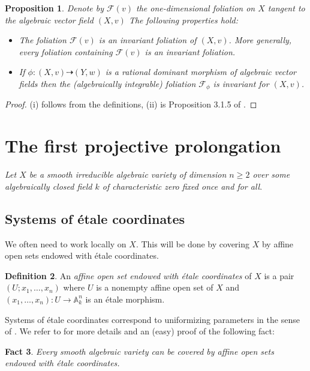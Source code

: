 \documentclass[12pt]{amsart}
\theoremstyle{definition}
\newtheorem{definition}{Definition}[subsection]
\theoremstyle{plain}
\newtheorem{proposition}[definition]{Proposition}
\newtheorem{fact}[definition]{Fact}
\theoremstyle{exampstyle}
\theoremstyle{exampstyle}\newtheorem{thmxbis}{Theorem}
\numberwithin{equation}{section}
\theoremstyle{remark}
\begin{document}
\begin{proposition} \label{proposition rational factors to invariant foliations}
Denote by $\mathcal F(v)$ the one-dimensional foliation on $X$ tangent to the algebraic vector field $(X,v)$ The following properties hold:
\begin{itemize} 
\item[(i)] The foliation $\mathcal F(v)$ is an invariant foliation of $(X,v)$. More generally, every foliation containing $\mathcal F(v)$ is an invariant foliation.
\item[(ii)] If $\phi: (X,v) \dashrightarrow (Y,w)$ is a rational dominant morphism of algebraic vector fields then the (algebraically integrable) foliation $\mathcal F_\phi$ is invariant for $(X,v)$.
\end{itemize} 
\end{proposition} 

\begin{proof} 
(i) follows from the definitions, (ii) is Proposition 3.1.5 of \cite{jaoui-Confluentes}. 
\end{proof}


\section{The first projective prolongation}
{\em{Let $X$ be a smooth irreducible algebraic variety of dimension $n \geq 2$ over some algebraically closed field $k$ of characteristic zero fixed once and for all}}. 

 
\subsection{Systems of étale coordinates} We often need to work locally on $X$. This will be done by covering $X$ by affine open sets endowed with étale coordinates.

\begin{definition}
An {\em affine open set endowed with étale coordinates} of $X$ is a pair $(U; x_1,\ldots, x_n)$ where $U$ is a nonempty affine open set of $X$ and $(x_1,\ldots, x_n): U \rightarrow \mathbb{A}^n_k$ is an étale morphism. 
\end{definition}
Systems of étale coordinates correspond to uniformizing parameters in the sense of \cite{Mumford}. We refer to \cite[Chapter III, Section 6]{Mumford} for more details and an (easy) proof of the following fact:
\begin{fact}
Every smooth algebraic variety can be covered by affine open sets endowed with étale coordinates.
\end{fact} 
\end{document}
